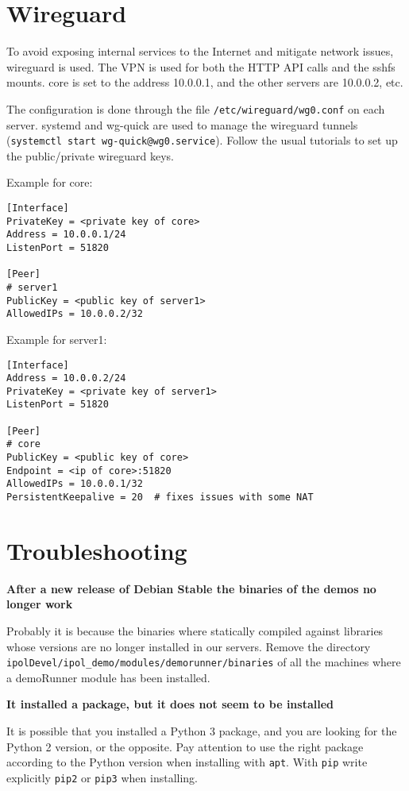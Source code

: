 \documentclass[a4paper,12pt]{article}
\begin{document}
\section{Wireguard}

To avoid exposing internal services to the Internet and mitigate network issues, wireguard is used.
The VPN is used for both the HTTP API calls and the sshfs mounts.
core is set to the address 10.0.0.1, and the other servers are 10.0.0.2, etc.

The configuration is done through the file {\tt /etc/wireguard/wg0.conf} on each server.
systemd and wg-quick are used to manage the wireguard tunnels ({\tt systemctl start wg-quick@wg0.service}).
Follow the usual tutorials to set up the public/private wireguard keys.

Example for core:
\begin{verbatim}
[Interface]
PrivateKey = <private key of core>
Address = 10.0.0.1/24
ListenPort = 51820

[Peer]
# server1
PublicKey = <public key of server1>
AllowedIPs = 10.0.0.2/32
\end{verbatim}

Example for server1:
\begin{verbatim}
[Interface]
Address = 10.0.0.2/24
PrivateKey = <private key of server1>
ListenPort = 51820

[Peer]
# core
PublicKey = <public key of core>
Endpoint = <ip of core>:51820
AllowedIPs = 10.0.0.1/32
PersistentKeepalive = 20  # fixes issues with some NAT
\end{verbatim}


\section{Troubleshooting}

\textbf{After a new release of Debian Stable the binaries of the demos no longer work}

Probably it is because the binaries where statically compiled against libraries whose versions are no longer installed in our servers. Remove the directory {\tt ipolDevel/ipol\_demo/modules/demorunner/binaries} of all the machines where a demoRunner module has been installed.
\vspace{0.5cm}

\textbf{It installed a package, but it does not seem to be installed}

It is possible that you installed a Python 3 package, and you are looking for the Python 2 version, or the opposite. Pay attention to use the right package according to the Python version when installing with {\tt apt}. With {\tt pip} write explicitly {\tt pip2} or {\tt pip3} when installing.
\vspace{0.5cm}
\end{document}
